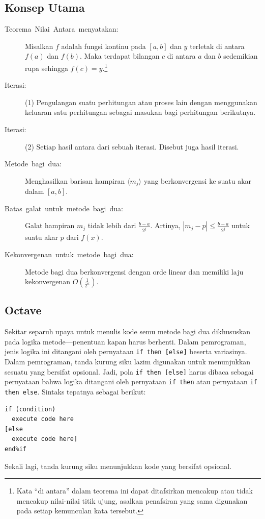 \subsection*{Konsep Utama}
\begin{description}
\item [{Teorema~Nilai~Antara~menyatakan:}] Misalkan
$f$ adalah fungsi kontinu pada $[a,b]$ dan $y$ terletak di antara
$f(a)$ dan $f(b)$. Maka terdapat bilangan $c$ di antara $a$ dan
$b$ sedemikian rupa sehingga $f(c)=y$.\footnote{Kata ``di antara'' dalam teorema ini dapat ditafsirkan mencakup
atau tidak mencakup nilai-nilai titik ujung, asalkan penafsiran yang
sama digunakan pada setiap kemunculan kata tersebut.}
\item [{Iterasi:}] (1) Pengulangan suatu perhitungan atau proses lain dengan
menggunakan keluaran satu perhitungan sebagai masukan bagi perhitungan
berikutnya.
\item [{Iterasi:}] (2) Setiap hasil antara dari sebuah iterasi. Disebut
juga hasil iterasi.
\item [{Metode~bagi~dua:}] Menghasilkan barisan hampiran $\langle m_{j}\rangle$
yang berkonvergensi ke suatu akar dalam $[a,b]$.
\item [{Batas~galat~untuk~metode~bagi~dua:}] Galat hampiran $m_{j}$
tidak lebih dari $\frac{b-a}{2^{j}}$. Artinya, $|m_{j}-p|\leq\frac{b-a}{2^{j}}$
untuk suatu akar $p$ dari $f(x)$.
\item [{Kekonvergenan~untuk~metode~bagi~dua:}] Metode bagi dua berkonvergensi
dengan orde linear dan memiliki laju kekonvergenan $O\left(\frac{1}{2^{n}}\right)$.
\end{description}

\subsection*{Octave}

Sekitar separuh upaya untuk menulis kode semu metode bagi dua dikhususkan
pada logika metode---penentuan kapan harus berhenti. Dalam pemrograman,
jenis logika ini ditangani oleh pernyataan \texttt{if then {[}else{]}}
beserta variasinya. Dalam pemrograman, tanda kurung siku lazim digunakan
untuk menunjukkan sesuatu yang bersifat opsional. Jadi, pola \texttt{if
then {[}else{]}} harus dibaca sebagai pernyataan bahwa logika ditangani
oleh pernyataan \texttt{if then} atau pernyataan \texttt{if then else}.
Sintaks tepatnya sebagai berikut: \begin{verbatim}
if (condition)
  execute code here
[else
  execute code here]
end%if
\end{verbatim}Sekali lagi, tanda kurung siku menunjukkan kode yang bersifat opsional. 

